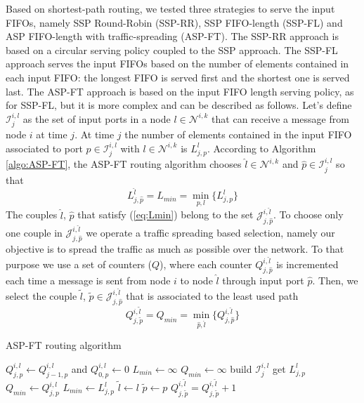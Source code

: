 \documentclass[10pt,twocolumn,journal]{IEEEtran}
\begin{document}
Based on shortest-path routing, we tested three strategies to serve the input FIFOs, namely SSP Round-Robin (SSP-RR), 
SSP FIFO-length (SSP-FL) and ASP FIFO-length with traffic-spreading (ASP-FT). 
The SSP-RR approach is based on a circular serving policy coupled to the SSP approach.
The SSP-FL approach serves the input FIFOs based on the number of elements contained in each input FIFO: the longest FIFO is served first and the shortest one is served last. 
The ASP-FT approach is based on the input FIFO length serving policy, as for SSP-FL, but it is more complex and 
can be described as follows. Let's define 
$\mathcal{I}^{i,l}_j$ as the set of input ports in a node $l \in \mathcal{N}^{i,k}$ 
that can receive a message from node $i$ at time $j$. At time $j$ the number of elements contained in the 
input FIFO associated to port $p \in \mathcal{I}^{i,l}_j$ with $l \in \mathcal{N}^{i,k}$ is $L^l_{j,p}$.
According to Algorithm \ref{algo:ASP-FT}, the ASP-FT routing algorithm chooses 
$\hat{l} \in \mathcal{N}^{i,k}$ and $\hat{p} \in \mathcal{I}^{i,l}_j$ 
so that 
\begin{equation}
L^{\hat{l}}_{j,\hat{p}} = L_{min} = \min_{p,l}\{L^l_{j,p}\}
\label{eq:Lmin}
\end{equation}
The couples $\hat{l}$, $\hat{p}$ that satisfy (\ref{eq:Lmin}) belong to the set 
$\mathcal{J}^{i,\hat{l}}_{j,\hat{p}}$.
To choose only one couple in $\mathcal{J}^{i,\hat{l}}_{j,\hat{p}}$ we operate a traffic spreading based selection, namely our objective is to spread the traffic as much as 
possible over the network. To that purpose we use a set of counters ($Q$), where each counter 
$Q^{i,\hat{l}}_{j,\hat{p}}$ is incremented 
each time a message is sent from node $i$ to node $\hat{l}$ through input port $\hat{p}$.
Then, we select the couple $\tilde{l}$, $\tilde{p} \in \mathcal{J}^{i,\hat{l}}_{j,\hat{p}}$ that is associated 
to the least used path 
\begin{equation}
Q^{i,\tilde{l}}_{j,\tilde{p}}=Q_{min}=\min_{\hat{p},\hat{l}}\{Q^{i,\hat{l}}_{j,\hat{p}}\}
\end{equation}
\begin{algorithm}
  \caption{ASP-FT routing algorithm}
  \label{algo:ASP-FT}
  \begin{algorithmic}[1]
    \REQUIRE $Q^{i,l}_{j,p} \leftarrow Q^{i,l}_{j-1,p}$ and $Q^{i,l}_{0,p} \leftarrow 0$ 
    \STATE $L_{min} \leftarrow \infty$ 
    \STATE $Q_{min} \leftarrow \infty$ 
    \STATE build $\mathcal{I}^{i,l}_j$
    \STATE get $L^l_{j,p}$
    \STATE $Q_{min} \leftarrow Q^{i,l}_{j,p}$
    \STATE $L_{min} \leftarrow L^l_{j,p}$
    \STATE $\tilde{l} \leftarrow l$
    \STATE $\tilde{p} \leftarrow p$
    \ENDIF
    \ENDIF
    \ENDFOR
    \ENDFOR
    \STATE $Q^{i,\tilde{l}}_{j,\tilde{p}}=Q^{i,\tilde{l}}_{j,\tilde{p}}+1$
  \end{algorithmic}
\end{algorithm}
\end{document}
